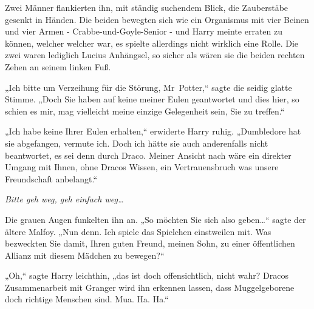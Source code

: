 Zwei Männer flankierten ihn, mit ständig suchendem Blick, die Zauberstäbe gesenkt in Händen. Die beiden bewegten sich wie ein Organismus mit vier Beinen und vier Armen - Crabbe-und-Goyle-Senior - und Harry meinte erraten zu können, welcher welcher war, es spielte allerdings nicht wirklich eine Rolle. Die zwei waren lediglich Lucius Anhängsel, so sicher als wären sie die beiden rechten Zehen an seinem linken Fuß.

„Ich bitte um Verzeihung für die Störung, Mr~Potter,“ sagte die seidig glatte Stimme. „Doch Sie haben auf keine meiner Eulen geantwortet und dies hier, so schien es mir, mag vielleicht meine einzige Gelegenheit sein, Sie zu treffen.“

„Ich habe keine Ihrer Eulen erhalten,“ erwiderte Harry ruhig. „Dumbledore hat sie abgefangen, vermute ich. Doch ich hätte sie auch anderenfalls nicht beantwortet, es sei denn durch Draco. Meiner Ansicht nach wäre ein direkter Umgang mit Ihnen, ohne Dracos Wissen, ein Vertrauensbruch was unsere Freundschaft anbelangt.“

\emph{Bitte geh weg, geh einfach weg…}

Die grauen Augen funkelten ihn an. „So möchten Sie sich also geben…“ sagte der ältere Malfoy. „Nun denn. Ich spiele das Spielchen einstweilen mit. Was bezweckten Sie damit, Ihren guten Freund, meinen Sohn, zu einer öffentlichen Allianz mit diesem Mädchen zu bewegen?“

„Oh,“ sagte Harry leichthin, „das ist doch offensichtlich, nicht wahr? Dracos Zusammenarbeit mit Granger wird ihn erkennen lassen, dass Muggelgeborene doch richtige Menschen sind. Mua. Ha. Ha.“

